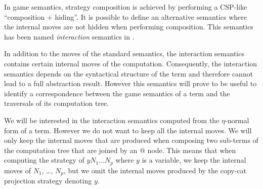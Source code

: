 In game semantics, strategy composition is achieved by performing a CSP-like ``composition + hiding''.
It is possible to define an alternative semantics where the internal moves are not hidden when performing composition.
This semantics has been named \emph{interaction} semantics in \cite{DBLP:conf/sas/DimovskiGL05}.

In addition to the moves of the standard semantics, the interaction semantics contains certain
internal moves of the computation.
Consequently, the interaction semantics depends on the syntactical structure of the term and therefore cannot
lead to a full abstraction result. However this semantics will prove to be useful to identify
a correspondence between the game semantics
of a term and the traversals of its computation tree.

We will be interested in the interaction semantics computed from the
$\eta$-normal form of a term. However we do not want to keep all the internal moves. We will only keep the internal
moves that are produced when composing two sub-terms of the computation tree that are joined by an $@$ node.
This means that when computing the strategy of
$y N_1 \ldots N_p$ where $y$ is a variable, we keep the internal moves of $N_1$, \ldots, $N_p$, but
we omit the internal moves produced by the copy-cat projection strategy denoting $y$.

